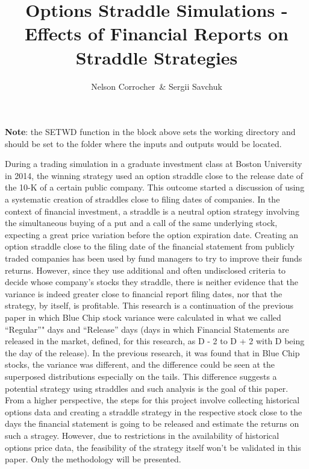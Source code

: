 \documentclass[english,man]{apa6}
\title{Options Straddle Simulations - Effects of Financial Reports on Straddle
Strategies}
\author{Nelson Corrocher~\& Sergii Savchuk}
\affiliation{
    \vspace{0.5cm}
          \textsuperscript{} Harrisburg University  }
\begin{document}
\maketitle

\setcounter{secnumdepth}{0}



\textbf{Note}: the SETWD function in the block above sets the working
directory and should be set to the folder where the inputs and outputs
would be located.

During a trading simulation in a graduate investment class at Boston
University in 2014, the winning strategy used an option straddle close
to the release date of the 10-K of a certain public company. This
outcome started a discussion of using a systematic creation of straddles
close to filing dates of companies. In the context of financial
investment, a straddle is a neutral option strategy involving the
simultaneous buying of a put and a call of the same underlying stock,
expecting a great price variation before the option expiration date.
Creating an option straddle close to the filing date of the financial
statement from publicly traded companies has been used by fund managers
to try to improve their funds returns. However, since they use
additional and often undisclosed criteria to decide whose company's
stocks they straddle, there is neither evidence that the variance is
indeed greater close to financial report filing dates, nor that the
strategy, by itself, is profitable. This research is a continuation of
the previous paper in which Blue Chip stock variance were calculated in
what we called \enquote{Regular}" days and \enquote{Release} days (days
in which Financial Statements are released in the market, defined, for
this research, as D - 2 to D + 2 with D being the day of the release).
In the previous research, it was found that in Blue Chip stocks, the
variance was different, and the difference could be seen at the
superposed distributions especially on the tails. This difference
suggests a potential strategy using straddles and such analysis is the
goal of this paper. From a higher perspective, the steps for this
project involve collecting historical options data and creating a
straddle strategy in the respective stock close to the days the
financial statement is going to be released and estimate the returns on
such a stragey. However, due to restrictions in the availability of
historical options price data, the feasibility of the strategy itself
won't be validated in this paper. Only the methodology will be
presented.
\end{document}
